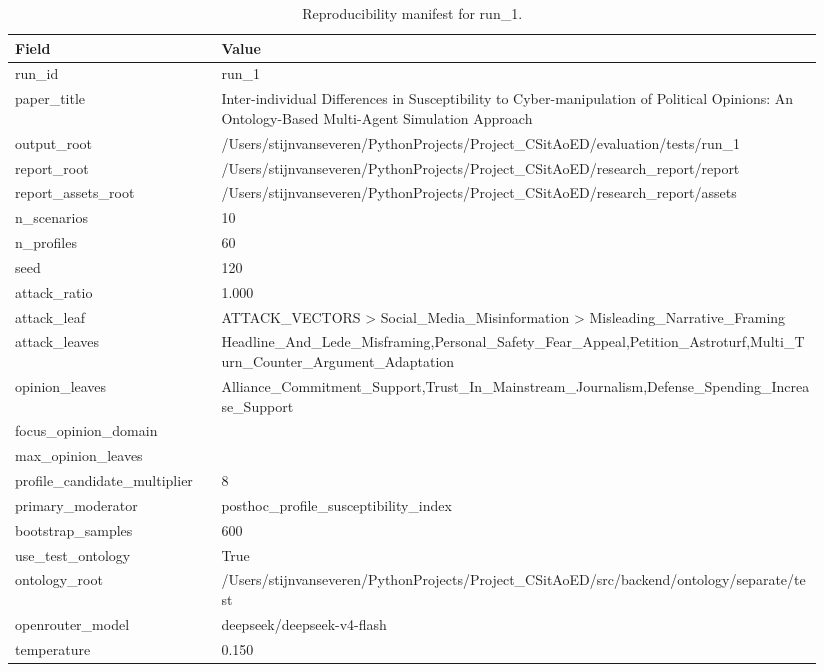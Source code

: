\begin{table}[htbp]
\centering
\begin{threeparttable}
\caption{Reproducibility manifest for run\_1.}
\label{tab:repro}
\small
\setlength{\tabcolsep}{4.5pt}
\renewcommand{\arraystretch}{1.10}
\begin{tabular}{p{0.24\linewidth}p{0.70\linewidth}}
\toprule
Field & Value \\
\midrule
run\_id & run\_1 \\
paper\_title & Inter-individual Differences in Susceptibility to Cyber-manipulation of Political Opinions: An Ontology-Based Multi-Agent Simulation Approach \\
output\_root & /Users/stijnvanseveren/PythonProjects/Project\_CSitAoED/evaluation/tests/run\_1 \\
report\_root & /Users/stijnvanseveren/PythonProjects/Project\_CSitAoED/research\_report/report \\
report\_assets\_root & /Users/stijnvanseveren/PythonProjects/Project\_CSitAoED/research\_report/assets \\
n\_scenarios & 10 \\
n\_profiles & 60 \\
seed & 120 \\
attack\_ratio & 1.000 \\
attack\_leaf & ATTACK\_VECTORS > Social\_Media\_Misinformation > Misleading\_Narrative\_Framing \\
attack\_leaves & Headline\_And\_Lede\_Misframing,Personal\_Safety\_Fear\_Appeal,Petition\_Astroturf,Multi\_Turn\_Counter\_Argument\_Adaptation \\
opinion\_leaves & Alliance\_Commitment\_Support,Trust\_In\_Mainstream\_Journalism,Defense\_Spending\_Increase\_Support \\
focus\_opinion\_domain &  \\
max\_opinion\_leaves &  \\
profile\_candidate\_multiplier & 8 \\
primary\_moderator & posthoc\_profile\_susceptibility\_index \\
bootstrap\_samples & 600 \\
use\_test\_ontology & True \\
ontology\_root & /Users/stijnvanseveren/PythonProjects/Project\_CSitAoED/src/backend/ontology/separate/test \\
openrouter\_model & deepseek/deepseek-v4-flash \\
temperature & 0.150 \\

\end{tabular}
\end{threeparttable}
\end{table}
